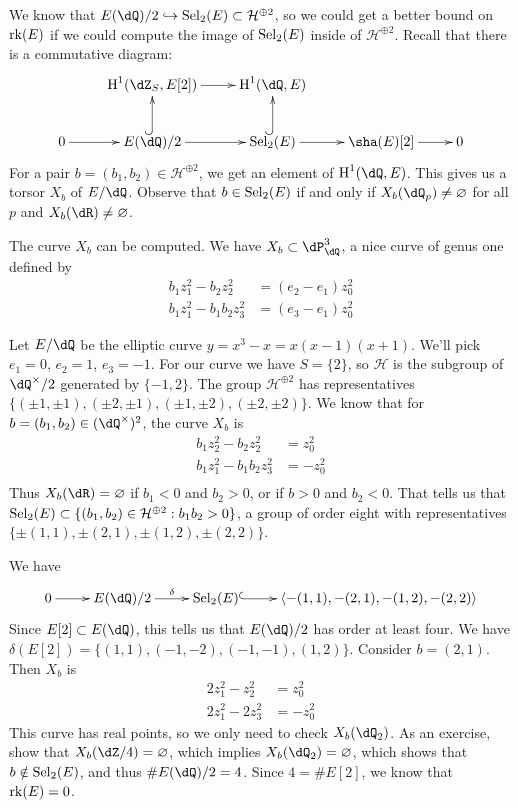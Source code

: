 \documentclass{article}
\begin{document}
\begin{example}[descent]
We know that $E(\dQ)/2\hookrightarrow \selmer_2(E)\subset \mathcal H^{\oplus 2}$, 
so we could get a better bound on $\operatorname{rk}(E)$ if we could compute 
the image of $\operatorname{Sel}_2(E)$ inside of $\mathcal H^{\oplus 2}$. Recall that there 
is a commutative diagram:
\[\xymatrix{
  & \h^1(\dZ_S,E[2]) \ar[r] 
    & \h^1(\dQ,E) \\
  0 \ar[r] 
    & E(\dQ)/2 \ar[r] \ar@{^{(}->}[u] 
    & \selmer_2(E) \ar[r] \ar@{^{(}->}[u] 
    & \sha(E)[2] \ar[r]
    & 0
}\]
For a pair $b=(b_1,b_2)\in \mathcal H^{\oplus 2}$, we get an element of 
$\h^1(\dQ,E)$. This gives us a torsor $X_b$ of $E/\dQ$. Observe that 
$b\in \operatorname{Sel}_2(E)$ if and only if $X_b(\dQ_p)\ne \varnothing$ for all $p$ and 
$X_b(\dR)\ne\varnothing$. 

The curve $X_b$ can be computed. We have $X_b\subset \dP_\dQ^3$, a nice curve 
of genus one defined by 
\begin{align*}
  b_1 z_1^2 - b_2 z_2^2 &= (e_2-e_1)z_0^2 \\
  b_1 z_1^2 - b_1 b_2 z_3^2 &= (e_3 -e_1) z_0^2
\end{align*}
\end{example}

\begin{example}
Let $E/\dQ$ be the elliptic curve $y=x^3-x=x(x-1)(x+1)$. We'll pick 
$e_1=0$, $e_2=1$, $e_3=-1$. For our curve we have $S=\{2\}$, so $\mathcal H$ is 
the subgroup of $\dQ^\times/2$ generated by $\{-1,2\}$. The group 
$\mathcal H^{\oplus 2}$ has representatives 
$\{(\pm 1,\pm 1),(\pm 2,\pm 1),(\pm 1,\pm 2),(\pm 2,\pm 2)\}$. We know that for 
$b=(b_1,b_2)\in (\dQ^\times)^2$, the curve $X_b$ is 
\begin{align*}
  b_1 z_2^2 - b_2 z_2^2 &= z_0^2 \\
  b_1 z_1^2 - b_1 b_2 z_3^2&=-z_0^2 \\
\end{align*}
Thus $X_b(\dR)=\varnothing$ if $b_1<0$ and $b_2>0$, or if 
$b>0$ and $b_2<0$. That tells us that 
$\operatorname{Sel}_2(E)\subset \{(b_1,b_2)\in \mathcal H^{\oplus 2}:b_1 b_2>0\}$, a group of 
order eight with representatives $\{\pm (1,1),\pm (2,1),\pm (1,2),\pm (2,2)\}$. 

We have 
\[\xymatrix{
  0 \ar[r] 
    & E(\dQ)/2 \ar[r]^-\delta 
    & \selmer_2(E) \ar@{^{(}->}[r] 
    & \langle-(1,1),-(2,1),-(1,2),-(2,2)\rangle
}\]
Since $E[2]\subset E(\dQ)$, this tells us that $E(\dQ)/2$ has order at least 
four. We have $\delta(E[2])=\{(1,1),(-1,-2),(-1,-1),(1,2)\}$. Consider 
$b=(2,1)$. Then $X_b$ is 
\begin{align*}
  2 z_1^2 - z_2^2 &= z_0^2 \\
  2 z_1^2 - 2 z_3^2 &= -z_0^2
\end{align*}
This curve has real points, so we only need to check $X_b(\dQ_2)$. As an 
exercise, show that $X_b(\dZ/4)=\varnothing$, which implies 
$X_b(\dQ_2)=\varnothing$, which shows that $b\notin \operatorname{Sel}_2(E)$, and thus 
$\# E(\dQ)/2=4$. Since $4=\# E[2]$, we know that $\operatorname{rk}(E)=0$. 
\end{example}
\end{document}
